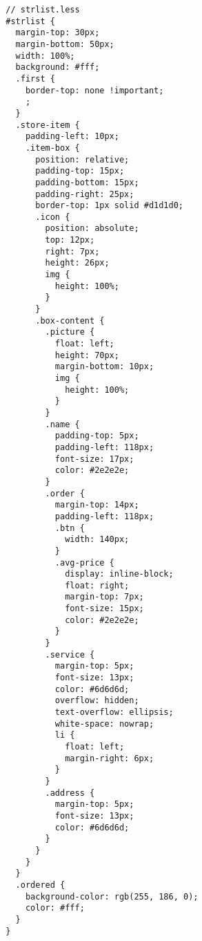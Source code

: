       \begin{lstlisting}
        // strlist.less
        #strlist {
          margin-top: 30px;
          margin-bottom: 50px;
          width: 100%;
          background: #fff;
          .first {
            border-top: none !important;
            ;
          }
          .store-item {
            padding-left: 10px;
            .item-box {
              position: relative;
              padding-top: 15px;
              padding-bottom: 15px;
              padding-right: 25px;
              border-top: 1px solid #d1d1d0;
              .icon {
                position: absolute;
                top: 12px;
                right: 7px;
                height: 26px;
                img {
                  height: 100%;
                }
              }
              .box-content {
                .picture {
                  float: left;
                  height: 70px;
                  margin-bottom: 10px;
                  img {
                    height: 100%;
                  }
                }
                .name {
                  padding-top: 5px;
                  padding-left: 118px;
                  font-size: 17px;
                  color: #2e2e2e;
                }
                .order {
                  margin-top: 14px;
                  padding-left: 118px;
                  .btn {
                    width: 140px;
                  }
                  .avg-price {
                    display: inline-block;
                    float: right;
                    margin-top: 7px;
                    font-size: 15px;
                    color: #2e2e2e;
                  }
                }
                .service {
                  margin-top: 5px;
                  font-size: 13px;
                  color: #6d6d6d;
                  overflow: hidden;
                  text-overflow: ellipsis;
                  white-space: nowrap;
                  li {
                    float: left;
                    margin-right: 6px;
                  }
                }
                .address {
                  margin-top: 5px;
                  font-size: 13px;
                  color: #6d6d6d;
                }
              }
            }
          }
          .ordered {
            background-color: rgb(255, 186, 0);
            color: #fff;
          }
        }
      \end{lstlisting}






